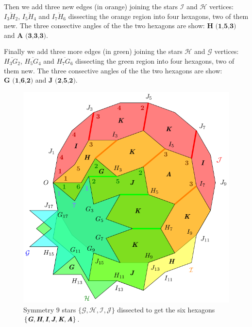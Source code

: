 \documentclass[11pt]{article}
\def\mathbi#1{\textbf{\em #1}}
\begin{document}
Then we add three new edges (in orange) joining the stars $\mathcal{I}$ and $\mathcal{H}$ vertices: $\overline{I_3H_2}$, $\overline{I_5H_4}$ and $\overline{I_7H_6}$ dissecting the orange region into four hexagons, two of them new. The three consective angles of the the two hexagons are show: $\textbf{H (1,5,3)}$ and $\textbf{A (3,3,3)}$.

Finally we add three more edges (in green) joining the stars $\mathcal{H}$ and $\mathcal{G}$ vertices:
$\overline{H_3G_2}$, $\overline{H_5G_4}$ and $\overline{H_7G_6}$ dissecting the green region into four hexagons, two of them new. The three consective angles of the the two hexagons are show: $\textbf{G (1,6,2)}$ and $\textbf{J (2,5,2)}$.


\begin{figure}[H]
\centering
\includegraphics[scale=1]{hexagons-9}
\caption{Symmetry $9$ stars $\{\mathcal{G},\mathcal{H},\mathcal{I},\mathcal{J}\}$
 dissected to get the six hexagons
$\{\mathbi{G},\mathbi{H},\mathbi{I},\mathbi{J},\mathbi{K},\mathbi{A}\}$.
}
\label{fig:hexagons-9}
\end{figure}
\end{document}
